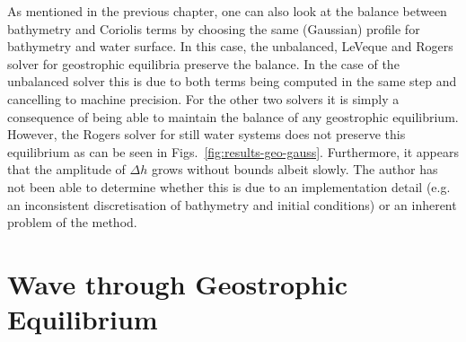 As mentioned in the previous chapter, one can also look at the balance between bathymetry and Coriolis terms by choosing the same (Gaussian) profile for bathymetry and water surface. In this case, the unbalanced, LeVeque and Rogers solver for geostrophic equilibria preserve the balance. In the case of the unbalanced solver this is due to both terms being computed in the same step and cancelling to machine precision. For the other two solvers it is simply a consequence of being able to maintain the balance of any geostrophic equilibrium. However, the Rogers solver for still water systems does not preserve this equilibrium as can be seen in Figs.~\ref{fig:results-geo-gauss}. Furthermore, it appears that the amplitude of $\Delta h$ grows without bounds albeit slowly. The author has not been able to determine whether this is due to an implementation detail (e.g. an inconsistent discretisation of bathymetry and initial conditions) or an inherent problem of the method.

\section{Wave through Geostrophic Equilibrium}

